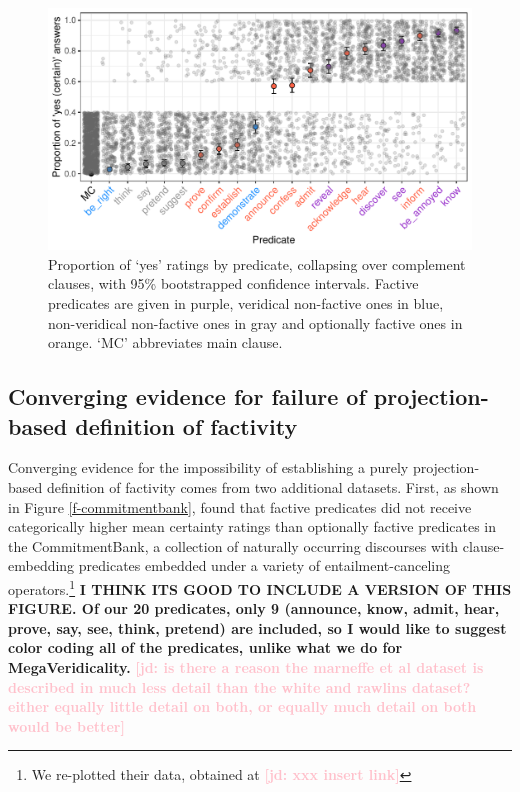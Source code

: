 \documentclass[11pt,fleqn]{article}
\newcommand{\jd}[1]{\textbf{\textcolor{Pink}{[jd: #1]}}}
\newcommand{\6}{\mbox{$[\hspace*{-.6mm}[$}}
\newcommand{\9}{\mbox{$]\hspace*{-.6mm}]$}}
\begin{document}
\begin{figure}[H]

\centering
\includegraphics[width=.7\paperwidth]{../../results/8-projectivity-no-fact-binary/graphs/proportion-by-predicate-variability}
\caption{Proportion of `yes' ratings by predicate, collapsing over complement clauses, with 95\% bootstrapped confidence intervals. Factive predicates are given in purple, veridical non-factive ones in blue, non-veridical non-factive ones in gray and optionally factive ones in orange. `MC' abbreviates main clause.}\label{f-projectivity2}

\end{figure}


\subsection{Converging evidence for failure of projection-based definition of factivity}

Converging evidence for the impossibility of establishing a purely projection-based definition of factivity comes from two additional datasets. First, as shown in Figure \ref{f-commitmentbank}, \citet*{demarneffe-etal-sub23} found that factive predicates did not receive categorically higher mean certainty ratings than optionally factive predicates in the CommitmentBank, a collection of naturally occurring discourses with clause-embedding predicates embedded under a variety of entailment-canceling operators.\footnote{We re-plotted their data, obtained at \jd{xxx insert link}} {\bf I THINK ITS GOOD TO INCLUDE A VERSION OF THIS FIGURE.  Of our 20 predicates, only 9 (announce, know, admit, hear, prove, say, see, think, pretend) are included, so I would like to suggest color coding all of the predicates, unlike what we do for MegaVeridicality.} \jd{is there a reason the marneffe et al dataset is described in much less detail than the white and rawlins dataset? either equally little detail on both, or equally much detail on both would be better}
\end{document}
